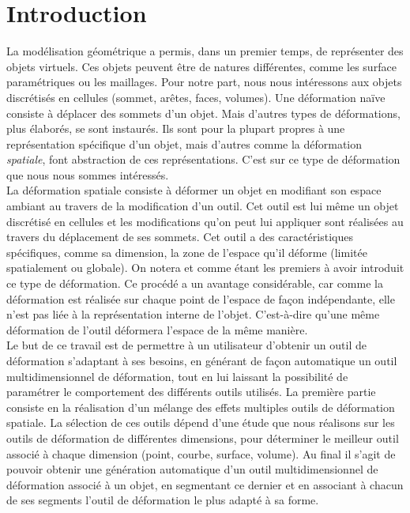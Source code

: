 
\chapter{Introduction}

\graphicspath{ {Introduction/IntroductionFigs/PNG/}
  {Introduction/IntroductionFigs/PDF/}
  {Introduction/IntroductionFigs/} }

La modélisation géométrique a permis, dans un premier temps, de
représenter des objets virtuels. Ces objets peuvent être de natures
différentes, comme les surface paramétriques ou les maillages. Pour
notre part, nous nous intéressons aux objets discrétisés en cellules
(sommet, arêtes, faces, volumes). Une déformation naïve consiste à
déplacer des sommets d'un objet. Mais d'autres types de déformations,
plus élaborés, se sont instaurés. Ils sont pour la plupart propres à
une représentation spécifique d'un objet, mais d'autres comme la
déformation \textit{spatiale}, font abstraction de ces
représentations. C'est sur ce type de déformation que nous nous sommes
intéressés.
\\

La déformation spatiale consiste à déformer un objet en modifiant son
espace ambiant au travers de la modification d'un outil. Cet outil est
lui même un objet discrétisé en cellules et les modifications qu'on
peut lui appliquer sont réalisées au travers du déplacement de ses
sommets. Cet outil a des caractéristiques spécifiques, comme sa
dimension, la zone de l'espace qu'il déforme (limitée spatialement ou
globale). On notera \cite{Bar84} et \cite{SP86} comme étant les
premiers à avoir introduit ce type de déformation. Ce procédé a un
avantage considérable, car comme la déformation est réalisée sur
chaque point de l'espace de façon indépendante, elle n'est pas liée à
la représentation interne de l'objet. C'est-à-dire qu'une même
déformation de l'outil déformera l'espace de la même manière.
\\

Le but de ce travail est de permettre à un utilisateur d'obtenir un
outil de déformation s'adaptant à ses besoins, en générant de façon
automatique un outil multidimensionnel de déformation, tout en lui
laissant la possibilité de paramétrer le comportement des différents
outils utilisés. La première partie consiste en la réalisation d'un
mélange des effets multiples outils de déformation spatiale. La
sélection de ces outils dépend d'une étude que nous réalisons sur les
outils de déformation de différentes dimensions, pour déterminer le
meilleur outil associé à chaque dimension (point, courbe, surface,
volume). Au final il s'agit de pouvoir obtenir une génération
automatique d'un outil multidimensionnel de déformation associé à un
objet, en segmentant ce dernier et en associant à chacun de ses
segments l'outil de déformation le plus adapté à sa forme.
\\

